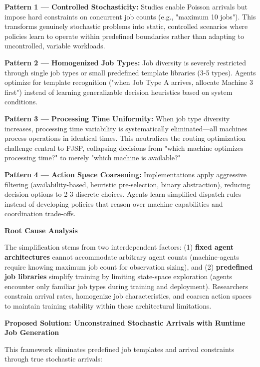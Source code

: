 \textbf{Pattern 1 — Controlled Stochasticity:} Studies enable Poisson arrivals but impose hard constraints on concurrent job counts (e.g., "maximum 10 jobs"). This transforms genuinely stochastic problems into static, controlled scenarios where policies learn to operate within predefined boundaries rather than adapting to uncontrolled, variable workloads.

\textbf{Pattern 2 — Homogenized Job Types:} Job diversity is severely restricted through single job types or small predefined template libraries (3-5 types). Agents optimize for template recognition ("when Job Type A arrives, allocate Machine 3 first") instead of learning generalizable decision heuristics based on system conditions.

\textbf{Pattern 3 — Processing Time Uniformity:} When job type diversity increases, processing time variability is systematically eliminated—all machines process operations in identical times. This neutralizes the routing optimization challenge central to FJSP, collapsing decisions from "which machine optimizes processing time?" to merely "which machine is available?"

\textbf{Pattern 4 — Action Space Coarsening:} Implementations apply aggressive filtering (availability-based, heuristic pre-selection, binary abstraction), reducing decision options to 2-3 discrete choices. Agents learn simplified dispatch rules instead of developing policies that reason over machine capabilities and coordination trade-offs.

\textbf{Root Cause Analysis}

The simplification stems from two interdependent factors: (1) \textbf{fixed agent architectures} cannot accommodate arbitrary agent counts (machine-agents require knowing maximum job count for observation sizing), and (2) \textbf{predefined job libraries} simplify training by limiting state-space exploration (agents encounter only familiar job types during training and deployment). Researchers constrain arrival rates, homogenize job characteristics, and coarsen action spaces to maintain training stability within these architectural limitations.

\textbf{Proposed Solution: Unconstrained Stochastic Arrivals with Runtime Job Generation}

This framework eliminates predefined job templates and arrival constraints through true stochastic arrivals:

